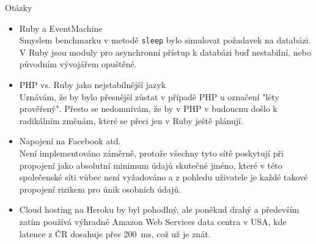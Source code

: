 \documentclass[xcolor=dvipsnames]{beamer}
\begin{document}
	\begin{frame}{Otázky}
  	\begin{itemize}
			\item Ruby a EventMachine\\
			  Smyslem benchmarku v metodě \texttt{sleep} bylo simulovat požadavek na databázi. V Ruby jsou moduly pro asynchronní přístup k databázi buď nestabilní, nebo původním vývojářem opuštěné.
			\item PHP vs. Ruby jako nejstabilnější jazyk\\
				Uznávám, že by bylo přesnější zůstat v případě PHP u označení "léty prověřený". Přesto se nedomnívám, že by v PHP v budoucnu došlo k radikálním změnám, které se přeci jen v Ruby ještě plánují.
			\item Napojení na Facebook atd.\\
				Není implementováno záměrně, protože všechny tyto sítě poskytují při propojení jako absolutní minimum údajů skutečné jméno, které v této společenské síti vůbec není vyžadováno a z pohledu uživatele je každé takové propojení rizikem pro únik osobních údajů.
			\item Cloud hosting na Heroku by byl pohodlný, ale poněkud drahý a především zatím používá výhradně Amazon Web Services data centra v USA, kde latence z ČR dosahuje přes 200~ms, což už je znát.
				
		\end{itemize}
	\end{frame}
\end{document}
